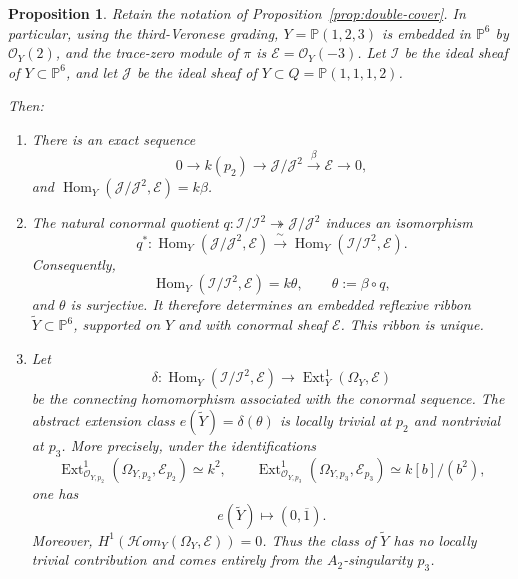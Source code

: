 \documentclass[11pt,twoside]{amsart}
\theoremstyle{plain}
\numberwithin{equation}{section}
\newtheorem{proposition}[theorem]{Proposition}
\theoremstyle{definition}
\begin{document}
\begin{proposition}\label{prop:reflexive-ribbon}
Retain the notation of Proposition~\ref{prop:double-cover}. In particular, using the third-Veronese grading, $Y=\mathbb P(1,2,3)$ is embedded in $\mathbb P^6$ by $\mathcal O_Y(2)$, and the trace-zero module of $\pi$ is $\mathcal E=\mathcal O_Y(-3)$. Let $\mathcal I$ be the ideal sheaf of $Y\subset\mathbb P^6$, and let $\mathcal J$ be the ideal sheaf of $Y\subset Q=\mathbb P(1,1,1,2)$.

Then:

\begin{enumerate}
\item There is an exact sequence
$$
0\longrightarrow k(p_2)
\longrightarrow \mathcal J/\mathcal J^2
\xrightarrow{\ \beta\ }\mathcal E
\longrightarrow 0,
$$
and $\operatorname{Hom}_Y(\mathcal J/\mathcal J^2,\mathcal E)=k\beta$.

\item The natural conormal quotient $q:\mathcal I/\mathcal I^2\twoheadrightarrow\mathcal J/\mathcal J^2$ induces an isomorphism
$$
q^*:\operatorname{Hom}_Y(\mathcal J/\mathcal J^2,\mathcal E)
\xrightarrow{\ \sim\ }
\operatorname{Hom}_Y(\mathcal I/\mathcal I^2,\mathcal E).
$$
Consequently,
$$
\operatorname{Hom}_Y(\mathcal I/\mathcal I^2,\mathcal E)
=k\theta,
\qquad
\theta:=\beta\circ q,
$$
and $\theta$ is surjective. It therefore determines an embedded reflexive ribbon $\widetilde Y\subset\mathbb P^6$, supported on $Y$ and with conormal sheaf $\mathcal E$. This ribbon is unique.

\item Let
$$
\delta:\operatorname{Hom}_Y(\mathcal I/\mathcal I^2,\mathcal E)
\longrightarrow
\operatorname{Ext}^1_Y(\Omega_Y,\mathcal E)
$$
be the connecting homomorphism associated with the conormal sequence. The abstract extension class $e(\widetilde Y)=\delta(\theta)$ is locally trivial at $p_2$ and nontrivial at $p_3$. More precisely, under the identifications
$$
\operatorname{Ext}^1_{\mathcal O_{Y,p_2}}
   (\Omega_{Y,p_2},\mathcal E_{p_2})\simeq k^2,
\qquad
\operatorname{Ext}^1_{\mathcal O_{Y,p_3}}
   (\Omega_{Y,p_3},\mathcal E_{p_3})
   \simeq k[b]/(b^2),
$$
one has
$$
e(\widetilde Y)\longmapsto (0,\overline{1}).
$$
Moreover, $H^1(\mathcal H om_Y(\Omega_Y,\mathcal E))=0$. Thus the class of $\widetilde Y$ has no locally trivial contribution and comes entirely from the $A_2$-singularity $p_3$.
\end{enumerate}
\end{proposition}
\end{document}
